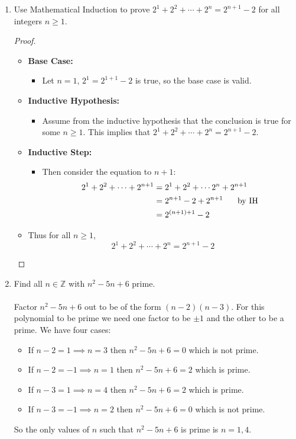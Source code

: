 \documentclass[class=article, crop=false]{standalone}
\def\integers{{\mathbb Z}}
\begin{document}
\begin{enumerate}[1.]
	\item Use Mathematical Induction to prove $2^1+2^2+\cdots+2^n=2^{n+1}-2$ for all integers $n\geq 1$.
	\begin{proof}
		$ $
		\begin{itemize}
			\item[] \textbf{Base Case:}
			\begin{itemize}
				\item[] Let $n=1$, $2^1=2^{1+1}-2$ is true, so the base case is valid.
			\end{itemize}
			\item[] \textbf{Inductive Hypothesis:}
			\begin{itemize}
				\item[] Assume from the inductive hypothesis that the conclusion is true for some $n\geq 1$.
				This implies that $2^1+2^2+\cdots+2^n=2^{n+1}-2$.
			\end{itemize}
			\item[] \textbf{Inductive Step:}
			\begin{itemize}
				\item[] Then consider the equation to $n+1$:
				\begin{align*}
					2^1+2^2+\cdots+2^{n+1} &= 2^1+2^2+\cdots2^n+2^{n+1} \\
					&= 2^{n+1}-2 + 2^{n+1} \hspace{5mm}\text{ by IH} \\
					&= 2^{(n+1)+1}-2
				\end{align*}
			\end{itemize}
			\item[] Thus for all $n\geq 1$, $$2^1+2^2+\cdots+2^n=2^{n+1}-2$$    
		\end{itemize}
	\end{proof}
	
	\item Find all $n\in\integers$ with $n^2-5n+6$ prime.\\\\
	Factor $n^2-5n+6$ out to be of the form $(n-2)(n-3)$. For this polynomial to be prime
	we need one factor to be $\pm1$ and the other to be a prime. We have four cases:
	\begin{itemize}
		\item If $n-2=1\implies n=3$ then $n^2-5n+6=0$ which is not prime.
		\item If $n-2=-1\implies n=1$ then $n^2-5n+6=2$ which is prime.
		\item If $n-3=1\implies n=4$ then $n^2-5n+6=2$ which is prime.
		\item If $n-3=-1\implies n=2$ then $n^2-5n+6=0$ which is not prime.
	\end{itemize}
	So the only values of $n$ such that $n^2-5n+6$ is prime is $n=1,4$.
	

\end{enumerate}
\end{document}
